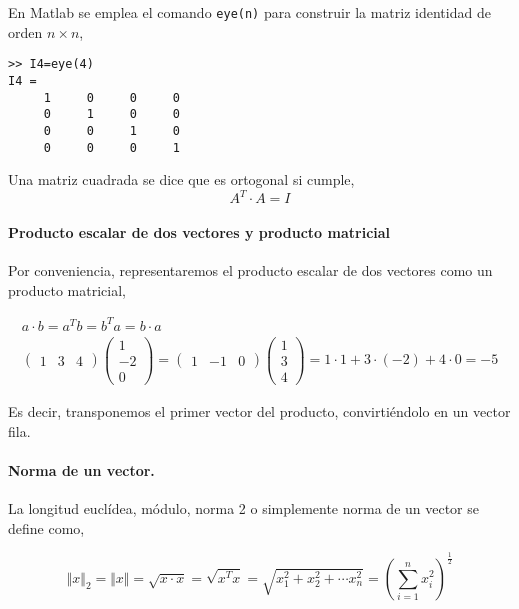 En Matlab se emplea el comando \texttt{eye(n)} para construir la matriz identidad de orden $n\times n$,

\begin{verbatim}
>> I4=eye(4)
I4 =
     1     0     0     0
     0     1     0     0
     0     0     1     0
     0     0     0     1
\end{verbatim}

Una matriz cuadrada se dice que es ortogonal si cumple,
\begin{equation*}
A^T\cdot A=I
\end{equation*}

\paragraph{Producto escalar de dos vectores y producto matricial} Por conveniencia,  representaremos el producto escalar de dos vectores como un producto matricial,

\begin{gather*}
a\cdot b= a^Tb=b^Ta=b\cdot a\\
\begin{pmatrix}
1& 3& 4
\end{pmatrix}
\begin{pmatrix}
1\\
-2\\
0
\end{pmatrix}
=
\begin{pmatrix}
1& -1& 0
\end{pmatrix}
\begin{pmatrix}
1\\
3\\
4
\end{pmatrix}
=1\cdot 1+3 \cdot (-2)+ 4 \cdot 0= -5
\end{gather*}

Es decir, transponemos el primer vector del producto, convirtiéndolo en un vector fila.

\paragraph{Norma de un vector.} La longitud euclídea, módulo,  norma 2 o simplemente norma  de un vector se define como,

\begin{equation*}
\Vert x \Vert_2 =\Vert x \Vert =\sqrt{x\cdot x}=\sqrt{x^Tx}=\sqrt{x_1^2+x_2^2+\cdots x_n^2}=\left( \sum_{i=1}^nx_i^2 \right)^\frac{1}{2}
\end{equation*}

